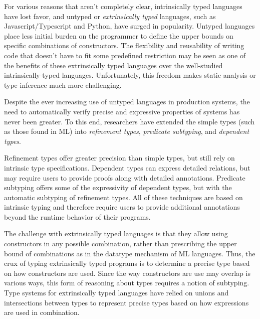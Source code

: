 \documentclass[acmsmall]{acmart}
\theoremstyle{definition}
\begin{document}
For various reasons that aren't completely clear, intrinsically typed languages have lost favor,
and untyped or \textit{extrinsically typed} languages, 
such as Javascript/Typescript and Python, have surged in popularity. 
Untyped languages place less initial burden on the programmer to define the upper bounds
on specific combinations of constructors.
The flexibility and reusability of writing code that doesn't have to fit some predefined restriction 
may be seen as one of the benefits of these extrinsically typed languages over the well-studied intrinsically-typed languages.
Unfortunately, this freedom makes static analysis or type inference much more challenging. 

Despite the ever increasing use of untyped languages in production systems, 
the need to automatically verify precise and expressive properties of systems has never been greater.
To this end, researchers have extended the simple types (such as those found in ML) into 
\textit{refinement types}, \textit{predicate subtyping}, and \textit{dependent types}. 

Refinement types offer greater precision than simple types, but still rely on intrinsic type specifications.
Dependent types can express detailed relations, but may require users to provide proofs along with detailed annotations.
Predicate subtyping offers some of the expressivity of dependent types, but with the automatic subtyping of refinement types.
All of these techniques are based on intrinsic typing and therefore require users to provide additional annotations
beyond the runtime behavior of their programs.

The challenge with extrinsically typed languages is that they allow using constructors
in any possible combination, rather than prescribing the upper bound of combinations as in
the datatype mechanism of ML languages. Thus, the crux of typing extrinsically typed programs is
to determine a precise type based on how constructors are used. 
Since the way constructors are use may overlap is various ways, this form of reasoning about types
requires a notion of subtyping.
Type systems for extrinsically typed languages have relied on unions and intersections between types to 
represent precise types based on how expressions are used in combination. 
\end{document}
